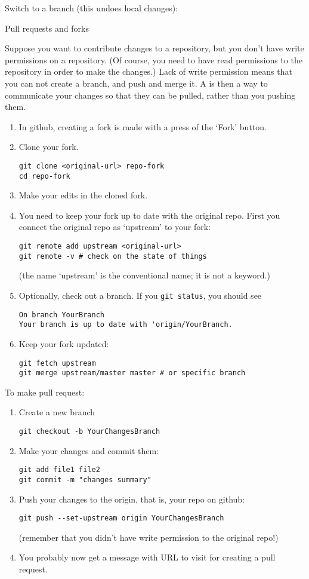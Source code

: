 Switch to a branch (this undoes local changes): 

 {Pull requests and forks}

Suppose you want to contribute changes to a repository,
but you don't have write permissions on a repository.
(Of course, you need to have read permissions to the repository
in order to make the changes.)
Lack of write permission means that you can not create a branch,
and push and merge it.
A  is then a way to communicate
your changes so that they can be pulled, rather
than you pushing them.

\begin{enumerate}
\item
  In github, creating a fork is made with a press of the `Fork' button.
\item
  Clone your fork.
\begin{verbatim}
git clone <original-url> repo-fork
cd repo-fork
\end{verbatim}
\item
  Make your edits in the cloned fork.
\item You need to keep your fork up to date with the original repo.
  First you connect the original repo as `upstream' to your fork:
\begin{verbatim}
git remote add upstream <original-url>
git remote -v # check on the state of things
\end{verbatim}
(the name `upstream' is the conventional name; it is not a keyword.)
\item
  Optionally, check out a branch. If you \texttt{git status}, you should see
\begin{verbatim}
On branch YourBranch
Your branch is up to date with 'origin/YourBranch.
\end{verbatim}
\item Keep your fork updated:
\begin{verbatim}
git fetch upstream
git merge upstream/master master # or specific branch
\end{verbatim}
\end{enumerate}

To make pull request:
\begin{enumerate}
\item Create a new branch
\begin{verbatim}
git checkout -b YourChangesBranch
\end{verbatim}
\item 
  Make your changes and commit them:
\begin{verbatim}
git add file1 file2
git commit -m "changes summary"
\end{verbatim}
\item Push your changes to the origin, that is,
  your repo on github:
\begin{verbatim}
git push --set-upstream origin YourChangesBranch
\end{verbatim}
(remember that you didn't have write permission to the original repo!)
\item You probably now get a message with URL to visit for creating
  a pull request.
\end{enumerate}


